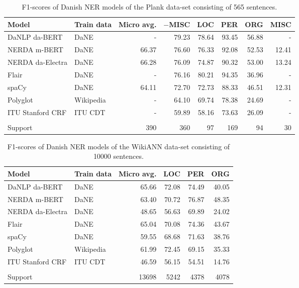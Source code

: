\documentclass[main.tex]{subfiles}
\begin{document}
\begin{table}[H]
	\begin{center}
		\begin{tabular}{l l r r r r r r}
			Model & Train data & Micro avg. & $-$MISC & LOC & PER & ORG & MISC \\
			\hline
			DaNLP da-BERT & DaNE & - & 79.23 & 78.64 & 93.45 & 56.88 & - \\
			NERDA m-BERT & DaNE & 66.37 & 76.60 & 76.33 & 92.08 & 52.53 & 12.41 \\
			NERDA da-Electra & DaNE & 66.28 & 76.09 & 74.87 & 90.32 & 53.00 & 13.24 \\
			Flair & DaNE & - & 76.16 & 80.21 & 94.35 & 36.96 & - \\
			spaCy & DaNE & 64.11 & 72.70 & 72.73 & 88.33 & 46.51 & 12.31 \\
			Polyglot & Wikipedia & - & 64.10 & 69.74 & 78.38 & 24.69 & - \\
			ITU Stanford CRF & ITU CDT & - & 59.89 & 58.16 & 73.63 & 26.09 & - \\
			 &  &  &  &  &  &  &  \\
			Support &  & 390 & 360 & 97 & 169 & 94 & 30 \\
		\end{tabular}
	\end{center}
	\caption{F1\pro-scores of Danish NER models of the Plank data-set consisting of 565 sentences.}
	\label{tab:Plank}
\end{table}

\begin{table}[H]
	\begin{center}
		\begin{tabular}{l l r r r r}
			Model & Train data & Micro avg. & LOC & PER & ORG \\
			\hline
			DaNLP da-BERT & DaNE & 65.66 & 72.08 & 74.49 & 40.05 \\
			NERDA m-BERT & DaNE & 63.40 & 70.72 & 76.87 & 48.35 \\
			NERDA da-Electra & DaNE & 48.65 & 56.63 & 69.89 & 24.02 \\
			Flair & DaNE & 65.04 & 70.08 & 74.36 & 43.67 \\
			spaCy & DaNE & 59.55 & 68.68 & 71.63 & 38.76 \\
			Polyglot & Wikipedia & 61.99 & 72.45 & 69.15 & 35.33 \\
			ITU Stanford CRF & ITU CDT & 46.59 & 56.15 & 54.51 & 14.76 \\
			 &  &  &  &  &  \\
			Support &  & 13698 & 5242 & 4378 & 4078 \\
		\end{tabular}
	\end{center}
	\caption{F1\pro-scores of Danish NER models of the WikiANN data-set consisting of 10000 sentences.}
	\label{tab:WikiANN}
\end{table}
\end{document}
